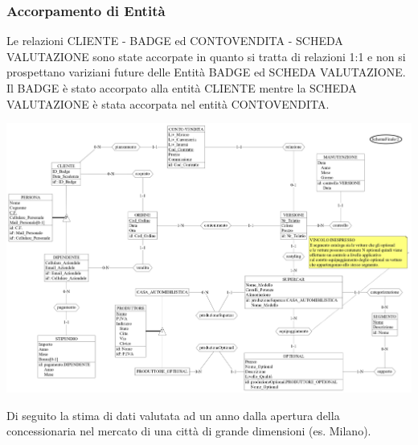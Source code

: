 \documentclass[12pt]{article}
\begin{document}
\subsubsection*{Accorpamento di Entità}

Le relazioni CLIENTE - BADGE ed CONTOVENDITA - SCHEDA VALUTAZIONE sono
state accorpate in quanto si tratta di relazioni 1:1 e non si
prospettano variziani future delle Entità BADGE ed SCHEDA
VALUTAZIONE. Il BADGE è stato accorpato alla entità CLIENTE mentre
la SCHEDA VALUTAZIONE è stata accorpata nel entità CONTOVENDITA.

\begin{center}
    \includegraphics[scale=0.80, angle=90]{images/schemaFinaleRistrutturato.jpeg}
\end{center}

Di seguito la stima di dati valutata ad un anno dalla apertura della
concessionaria nel mercato di una città di grande dimensioni (es. Milano). 
\end{document}
